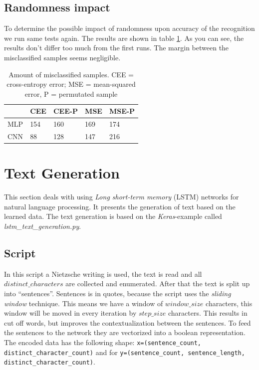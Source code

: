 \documentclass{article}[]
\begin{document}
\subsection{Randomness impact}
To determine the possible impact of randomness upon accuracy of the recognition we run same tests again.
The results are shown in table \ref{table-2}.
As you can see, the results don't differ too much from the first runs.
The margin between the misclassified samples seems negligible.


\begin{table}[H]
	\centering
	\begin{tabular}{|l|l|l|l|l|}
		\hline
		& \cellcolor[HTML]{C0C0C0}CEE & \cellcolor[HTML]{C0C0C0}CEE-P & \cellcolor[HTML]{C0C0C0}MSE & \cellcolor[HTML]{C0C0C0}MSE-P \\ \hline
		\cellcolor[HTML]{C0C0C0}MLP & \cellcolor[HTML]{FFFFFF}154 & 160                           & 169                         & 174                           \\ \hline
		\cellcolor[HTML]{C0C0C0}CNN & 88                          & 128                           & 147                         & 216                           \\ \hline
	\end{tabular}
	\caption{Amount of misclassified samples. CEE = cross-entropy error; MSE = mean-squared error, P = permutated sample}
	\label{table-2}
\end{table}

\section{Text Generation}
\label{sec:seq}
This section deals with using  \emph{Long short-term memory} (LSTM) networks for natural language processing.
It presents the generation of text based on the learned data.
The text generation is based on the \textit{Keras}-example called \textit{lstm\_text\_generation.py}\cite{kerasexamples}.


\subsection{Script}
\label{textgen-script}
In this script a Nietzsche writing is used, the text is read and all $distinct\_characters$ are collected and enumerated.
After that the text is split up into \enquote{sentences}.
Sentences is in quotes, because the script uses the \emph{sliding window} technique. %
This means we have a window of $window\_size$ characters, this window will be moved in every iteration by $step\_size$ characters.
This results in cut off words, but improves the contextualization between the sentences.
To feed the sentences to the network they are vectorized into a boolean representation.
The encoded data has the following shape:  \texttt{x=(sentence\_count, distinct\_character\_count)} and for 
\texttt{y=(sentence\_count, sentence\_length, distinct\_character\_count)}.
\end{document}
